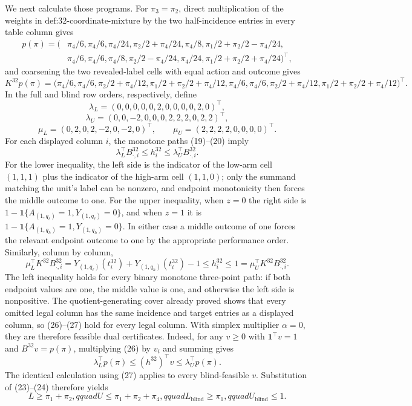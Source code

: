 We next calculate those programs.  For \(\pi_3=\pi_2\), direct multiplication of the weights in \(\text{def:32-coordinate-mixture}\) by the two half-incidence entries in every table column gives
\[
\begin{split}
p(\pi)=\bigl(&\pi_4/6,\pi_4/6,\pi_4/24,\pi_2/2+\pi_4/24,\pi_4/8,
\pi_1/2+\pi_2/2-\pi_4/24,\\
&\pi_4/6,\pi_4/6,\pi_4/8,\pi_2/2-\pi_4/24,\pi_4/24,
\pi_1/2+\pi_2/2+\pi_4/24\bigr)^{\top},
\end{split}
\tag{23}
\]
and coarsening the two revealed-label cells with equal action and outcome gives
\[
K^{32}p(\pi)=\bigl(\pi_4/6,\pi_4/6,\pi_2/2+\pi_4/12,
\pi_1/2+\pi_2/2+\pi_4/12,\pi_4/6,\pi_4/6,
\pi_2/2+\pi_4/12,\pi_1/2+\pi_2/2+\pi_4/12\bigr)^{\top}.
\tag{24}
\]
In the full and blind row orders, respectively, define
\[
\lambda_L=(0,0,0,0,0,2,0,0,0,0,2,0)^{\top},
\]
\[
\lambda_U=(0,0,-2,0,0,0,2,2,2,0,2,2)^{\top},
\]
\[
\mu_L=(0,2,0,2,-2,0,-2,0)^{\top},
\qquad
\mu_U=(2,2,2,2,0,0,0,0)^{\top}.
\tag{25}
\]
For each displayed column \(i\), the monotone paths (19)--(20) imply
\[
\lambda_L^{\top}B^{32}_{\cdot,i}\leq h^{32}_i
\leq\lambda_U^{\top}B^{32}_{\cdot,i}.
\tag{26}
\]
For the lower inequality, the left side is the indicator of the low-arm cell \((1,1,1)\) plus the indicator of the high-arm cell \((1,1,0)\); only the summand matching the unit's label can be nonzero, and endpoint monotonicity then forces the middle outcome to one.  For the upper inequality, when \(z=0\) the right side is \(1-\mathbf 1\{A_{(1,q_\ell)}=1,Y_{(1,q_\ell)}=0\}\), and when \(z=1\) it is \(1-\mathbf 1\{A_{(1,q_h)}=1,Y_{(1,q_h)}=0\}\).  In either case a middle outcome of one forces the relevant endpoint outcome to one by the appropriate performance order.  Similarly, column by column,
\[
\mu_L^{\top}K^{32}B^{32}_{\cdot,i}
=Y_{(1,q_\ell)}(t_i^{32})+Y_{(1,q_h)}(t_i^{32})-1
\leq h_i^{32}
\leq 1
=\mu_U^{\top}K^{32}B^{32}_{\cdot,i}.
\tag{27}
\]
The left inequality holds for every binary monotone three-point path: if both endpoint values are one, the middle value is one, and otherwise the left side is nonpositive.  The quotient-generating cover already proved shows that every omitted legal column has the same incidence and target entries as a displayed column, so (26)--(27) hold for every legal column.  With simplex multiplier \(\alpha=0\), they are therefore feasible dual certificates.  Indeed, for any \(v\geq0\) with \(\mathbf 1^{\top}v=1\) and \(B^{32}v=p(\pi)\), multiplying (26) by \(v_i\) and summing gives
\[
\lambda_L^{\top}p(\pi)\leq (h^{32})^{\top}v
\leq\lambda_U^{\top}p(\pi).
\]
The identical calculation using (27) applies to every blind-feasible \(v\).  Substitution of (23)--(24) therefore yields
\[
L\geq\pi_1+\pi_2,qquad
U\leq\pi_1+\pi_2+\pi_4,qquad
L_{\mathrm{blind}}\geq\pi_1,qquad
U_{\mathrm{blind}}\leq1.
\tag{28}
\]

